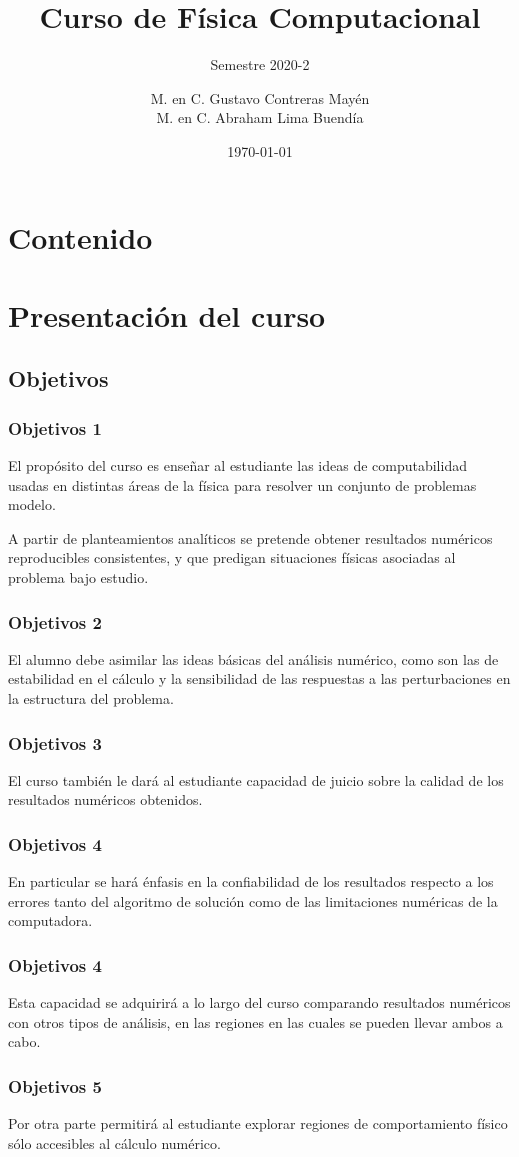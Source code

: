 \documentclass[12pt]{beamer}
\title{Curso de Física Computacional}
\subtitle{Semestre 2020-2}
\author[]{M. en C. Gustavo Contreras Mayén \\ M. en C. Abraham Lima Buendía}
\institute{Facultad de Ciencias - UNAM}
\date{\today}
\begin{document}
\maketitle
\section*{Contenido}
\fontsize{14}{14}\selectfont
\section{Presentación del curso}
\subsection{Objetivos}
\begin{frame}
\frametitle{Objetivos 1}
El propósito del curso es enseñar al estudiante las ideas de computabilidad usadas en distintas áreas de la  física para resolver un conjunto de problemas modelo. 
\end{frame}
\begin{frame}
A partir de planteamientos analíticos se pretende obtener resultados numéricos reproducibles consistentes, y que predigan situaciones físicas asociadas al problema bajo estudio.
\end{frame}
\begin{frame}
\frametitle{Objetivos 2}
El alumno debe asimilar las ideas básicas del análisis numérico, como son las de estabilidad en el cálculo y la sensibilidad de las respuestas a las perturbaciones en la estructura del problema.
\end{frame}
\begin{frame}
\frametitle{Objetivos 3}
El curso también le dará al estudiante capacidad de juicio sobre la calidad de los resultados numéricos obtenidos.
\end{frame}
\begin{frame}
\frametitle{Objetivos 4}
En particular se hará énfasis en la confiabilidad de los resultados respecto a los errores tanto del algoritmo de solución como de las limitaciones numéricas de la computadora. 
\end{frame}
\begin{frame}
\frametitle{Objetivos 4}
Esta capacidad se adquirirá a lo largo del curso comparando resultados numéricos con otros tipos de análisis, en las regiones en las cuales se pueden llevar ambos a cabo.
\end{frame}
\begin{frame}
\frametitle{Objetivos 5}
 Por otra parte permitirá al estudiante explorar regiones de comportamiento físico sólo accesibles al cálculo numérico.
\end{frame}
\end{document}
